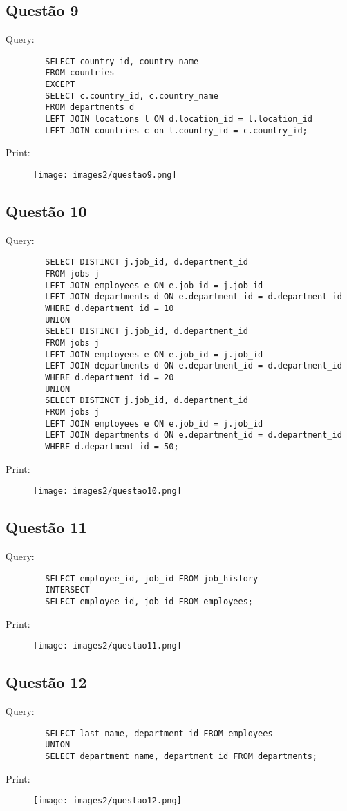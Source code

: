 \documentclass{article}[twocolumn]
\begin{document}
	\subsection{Quest\~ao 9}
	Query:
	\begin{verbatim}
		SELECT country_id, country_name
		FROM countries
		EXCEPT
		SELECT c.country_id, c.country_name
		FROM departments d
		LEFT JOIN locations l ON d.location_id = l.location_id
		LEFT JOIN countries c on l.country_id = c.country_id;
	\end{verbatim}
	Print:
	\begin{figure}[H]
		\centering
		\texttt{[image: images2/questao9.png]}
	\end{figure}
	\newpage
	\subsection{Quest\~ao 10}
	Query:
	\begin{verbatim}
		SELECT DISTINCT j.job_id, d.department_id
		FROM jobs j
		LEFT JOIN employees e ON e.job_id = j.job_id
		LEFT JOIN departments d ON e.department_id = d.department_id
		WHERE d.department_id = 10
		UNION
		SELECT DISTINCT j.job_id, d.department_id
		FROM jobs j
		LEFT JOIN employees e ON e.job_id = j.job_id
		LEFT JOIN departments d ON e.department_id = d.department_id
		WHERE d.department_id = 20
		UNION
		SELECT DISTINCT j.job_id, d.department_id
		FROM jobs j
		LEFT JOIN employees e ON e.job_id = j.job_id
		LEFT JOIN departments d ON e.department_id = d.department_id
		WHERE d.department_id = 50;
	\end{verbatim}
	Print:
	\begin{figure}[H]
		\centering
		\texttt{[image: images2/questao10.png]}
	\end{figure}
	\newpage
	\subsection{Quest\~ao 11}
	Query:
	\begin{verbatim}
		SELECT employee_id, job_id FROM job_history
		INTERSECT
		SELECT employee_id, job_id FROM employees;
	\end{verbatim}
	Print:
	\begin{figure}[H]
		\centering
		\texttt{[image: images2/questao11.png]}
	\end{figure}
	\newpage
	\subsection{Quest\~ao 12}
	Query:
	\begin{verbatim}
		SELECT last_name, department_id FROM employees
		UNION
		SELECT department_name, department_id FROM departments;
	\end{verbatim}
	Print:
	\begin{figure}[H]
		\centering
		\texttt{[image: images2/questao12.png]}
	\end{figure}
\end{document}
